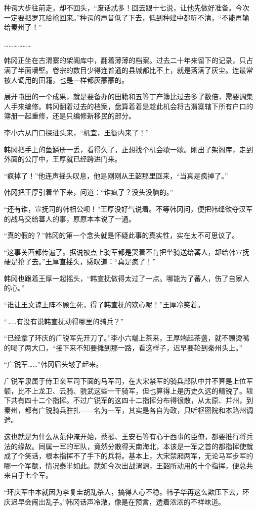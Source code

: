 种谔大步往前走，却不回头，“废话忒多！回去跟十七说，让他先做好准备。今次一定要把罗兀给抢回来。”种谔的声音低了下去，低到种建中都听不清，“不能再输给秦州了！”

………………

韩冈正坐在古渭寨的架阁库中，翻着薄薄的档案。过去二十年来留下的记录，只占满了半面墙壁。卷宗的数目少得连普通的县城都比不上，就是落满了灰尘。连最常被人调用的田籍，也是一样都灰蒙蒙的。

展开屯田的一个成果，就是要备办的田籍和五等丁产簿比过去多了数倍，需要调集人手来编修。韩冈翻着过去的档案，盘算着着是趁此机会将古渭寨辖下所有户口的簿册一起重修，还是只编修新移民的部分。

李小六从门口探进头来，“机宜，王衙内来了！”

韩冈把手上的鱼鳞册一丢，看得久了，正想找个机会歇一歇。刚出了架阁库，走到外面的公厅中，王厚就已经跨进门来。

“疯掉了！”他连声摇头叹息，他是刚刚从王韶那里回来，“当真是疯掉了。”

韩冈把王厚引着坐下来，问道：“谁疯了？没头没脑的。”

“还有谁，宣抚司的韩相公呗！”王厚没好气说着。不等韩冈问，便把韩绛欲夺汉军的战马交给蕃人的事，原原本本说了一通。

“真的假的？”韩冈的第一个念头就是怀疑此事的真实性，实在太不可思议了。

“这事关西都传遍了。据说被点上骑军都是哭着不肯把坐骑送给蕃人，却给韩宣抚硬是抢了去。”王厚直摇头，感叹道：“真是疯了！”

韩冈也跟着王厚一起摇头，“韩宣抚做得太过了一点。哪能为了蕃人，伤了自家人的心。”

“谁让王文谅上阵不顾生死，得了韩宣抚的欢心呢！”王厚冷笑着。

“……有没有说韩宣抚动得哪里的骑兵？”

“已经拿了环庆的广锐军先开刀了。”李小六端上茶来，王厚端起茶盏，就不顾烫嘴的喝了两大口，“接下来不知要摊到那一路，看这样子，迟早要轮到秦州头上。”

“广锐军……”韩冈眉头皱了起来。

广锐军隶属于侍卫亲军司下面的马军司，在大宋禁军的骑兵部队中并不算是上位军额，比不上龙卫、云骑、骁武这些一干骑军，但也算得上是历史久远的精锐了。辖下共有四十二个指挥。不过广锐军的这四十二指挥分布得很散，从太原、并州，到秦州，都有广锐骑兵驻扎——名为一军，其实是各自为政，只听枢密院和本路州调遣。

这也就是为什么从范仲淹开始，蔡挺、王安石等有心于西事的臣僚，都要推行将兵法的缘故。同属一军的军队，竟然分散得天南海北，本该是一军之首的都指挥使就成了个笑话，根本指挥不了手下的兵将。基本上，大宋禁厢两军，无论马军步军的哪一个军额，情况泰半如此。就如今次出战渭源，王韶所动用的十个指挥，便总共来自于七个军。

“环庆军中本就因为李复圭胡乱杀人，搞得人心不稳。韩子华再这么欺压下去，环庆迟早会闹出乱子。”韩冈话声冷澈，像是在预言，透着浓浓的不祥味道。


